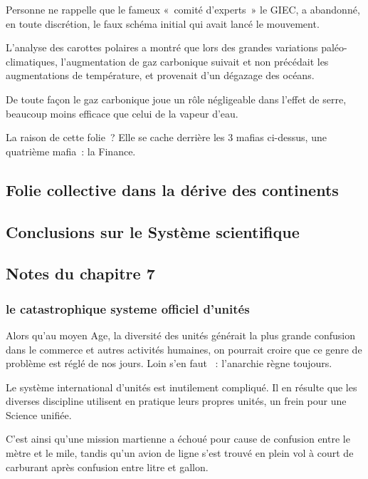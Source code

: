 \documentclass[a4paper,12pt]{article}
\begin{document}
Personne ne rappelle que le fameux « comité d’experts » le GIEC, a abandonné, en toute discrétion, le faux schéma initial qui avait lancé le mouvement.

L’analyse des carottes polaires a montré que lors des grandes variations paléo-climatiques, l’augmentation de gaz carbonique suivait et non précédait les augmentations de température, et provenait d’un dégazage des océans.

De toute façon le gaz carbonique joue un rôle négligeable dans l’effet de serre, beaucoup moins efficace que celui de la vapeur d’eau.

La raison de cette folie ? Elle se cache derrière les 3 mafias ci-dessus, une quatrième mafia : la Finance.




\subsection {Folie collective dans la dérive des continents}

\subsection {Conclusions sur le Système scientifique}

\subsection {Notes du chapitre 7}

\subsubsection {le catastrophique systeme officiel d'unités}

 Alors qu'au moyen Age, la diversité des unités générait la plus grande confusion dans le commerce et autres activités humaines, on pourrait croire que ce genre de problème est réglé de nos jours. Loin s'en faut   : l'anarchie règne toujours.
 

Le système international d'unités est inutilement compliqué. Il en résulte que les diverses discipline utilisent en pratique leurs propres unités, un frein pour  une Science unifiée. 


C'est ainsi qu'une mission martienne a échoué pour cause de confusion entre le mètre et le mile, tandis qu'un avion de ligne s'est trouvé en plein vol à court de carburant après confusion entre litre et gallon.
\end{document}
